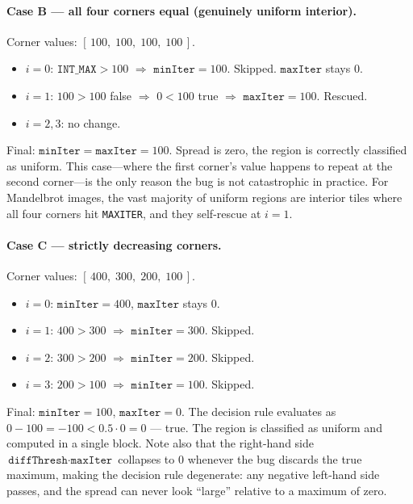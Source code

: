 \documentclass[
	english,
	letterpaper, oneside
]{article}
\begin{document}
\paragraph{Case B — all four corners equal (genuinely uniform interior).}
Corner values: $[\,100,\;100,\;100,\;100\,]$.

\begin{itemize}
    \item $i=0$: $\texttt{INT\_MAX} > 100$ $\Rightarrow$
          $\texttt{minIter} = 100$. Skipped. $\texttt{maxIter}$ stays $0$.
    \item $i=1$: $100 > 100$ false $\Rightarrow$ $0 < 100$ true
          $\Rightarrow$ $\texttt{maxIter} = 100$. Rescued.
    \item $i=2,3$: no change.
\end{itemize}

\noindent
Final: $\texttt{minIter} = \texttt{maxIter} = 100$. Spread is zero, the
region is correctly classified as uniform. This case—where the first
corner's value happens to repeat at the second corner—is the only reason
the bug is not catastrophic in practice. For Mandelbrot images, the vast
majority of uniform regions are interior tiles where all four corners hit
\texttt{MAXITER}, and they self-rescue at $i=1$.

\paragraph{Case C — strictly decreasing corners.}
Corner values: $[\,400,\;300,\;200,\;100\,]$.

\begin{itemize}
    \item $i=0$: $\texttt{minIter} = 400$, $\texttt{maxIter}$ stays $0$.
    \item $i=1$: $400 > 300$ $\Rightarrow$ $\texttt{minIter} = 300$.
          Skipped.
    \item $i=2$: $300 > 200$ $\Rightarrow$ $\texttt{minIter} = 200$.
          Skipped.
    \item $i=3$: $200 > 100$ $\Rightarrow$ $\texttt{minIter} = 100$.
          Skipped.
\end{itemize}

\noindent
Final: $\texttt{minIter} = 100$, $\texttt{maxIter} = 0$. The decision
rule evaluates as $0 - 100 = -100 < 0.5 \cdot 0 = 0$ — true. The region
is classified as uniform and computed in a single block. Note also that
the right-hand side $\texttt{diffThresh} \cdot \texttt{maxIter}$
collapses to $0$ whenever the bug discards the true maximum, making the
decision rule degenerate: any negative left-hand side passes, and
the spread can never look ``large'' relative to a maximum of zero.
\end{document}

